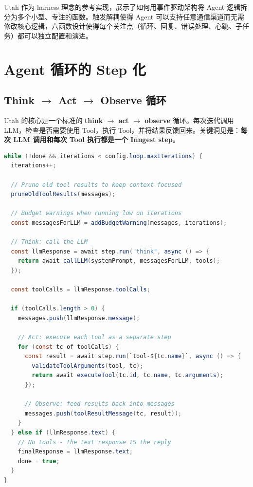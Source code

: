\documentclass[a4paper]{article}
\begin{document}
Utah 作为 harness 理念的参考实现，展示了如何用事件驱动架构将 Agent 逻辑拆分为多个小型、专注的函数。触发解耦使得 Agent 可以支持任意通信渠道而无需修改核心逻辑，六函数设计使得每个关注点（循环、回复、错误处理、心跳、子任务）都可以独立配置和演进。


\section{Agent 循环的 Step 化}

\subsection{Think $\to$ Act $\to$ Observe 循环}

Utah 的核心是一个标准的 \textbf{think $\to$ act $\to$ observe} 循环。每次迭代调用 LLM，检查是否需要使用 Tool，执行 Tool，并将结果反馈回来。关键洞见是：\textbf{每次 LLM 调用和每次 Tool 执行都是一个 Inngest step}。

\begin{lstlisting}[caption={Utah Agent 循环核心逻辑（简化版）},language=Java]
while (!done && iterations < config.loop.maxIterations) {
  iterations++;

  // Prune old tool results to keep context focused
  pruneOldToolResults(messages);

  // Budget warnings when running low on iterations
  const messagesForLLM = addBudgetWarning(messages, iterations);

  // Think: call the LLM
  const llmResponse = await step.run("think", async () => {
    return await callLLM(systemPrompt, messagesForLLM, tools);
  });

  const toolCalls = llmResponse.toolCalls;

  if (toolCalls.length > 0) {
    messages.push(llmResponse.message);

    // Act: execute each tool as a separate step
    for (const tc of toolCalls) {
      const result = await step.run(`tool-${tc.name}`, async () => {
        validateToolArguments(tool, tc);
        return await executeTool(tc.id, tc.name, tc.arguments);
      });

      // Observe: feed results back into messages
      messages.push(toolResultMessage(tc, result));
    }
  } else if (llmResponse.text) {
    // No tools - the text response IS the reply
    finalResponse = llmResponse.text;
    done = true;
  }
}
\end{lstlisting}
\end{document}
